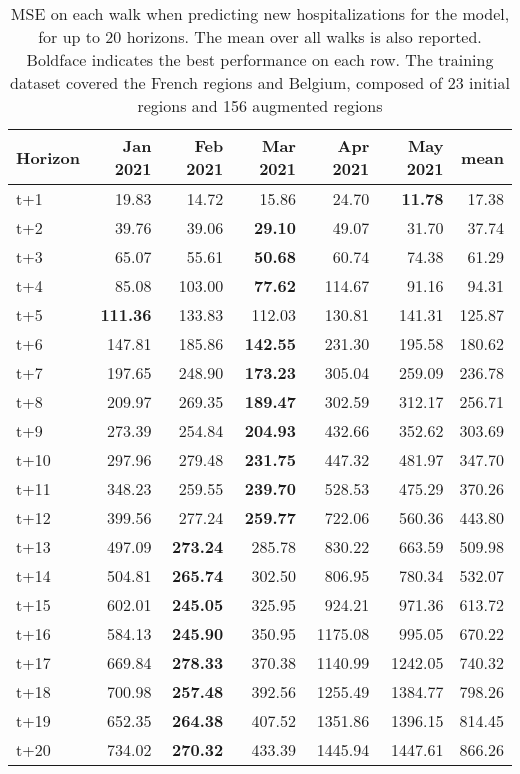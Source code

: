 \begin{table}[H]
\centering
\caption{MSE on each walk when predicting new hospitalizations for the model, for up to 20 horizons. The mean over all walks is also reported. Boldface indicates the best performance on each row. The training dataset covered the French regions and Belgium, composed of 23 initial regions and 156 augmented regions }
\label{tab:MSE_walk_dense_model}
\begin{tabular}{lrrrrrr}
\toprule
Horizon &  Jan 2021 &  Feb 2021 &  Mar 2021 &  Apr 2021 &  May 2021 &   mean \\
\midrule
t+1  & 19.83  & 14.72  & 15.86  & 24.70  & \textbf{11.78}  & 17.38  \\
t+2  & 39.76  & 39.06  & \textbf{29.10}  & 49.07  & 31.70  & 37.74  \\
t+3  & 65.07  & 55.61  & \textbf{50.68}  & 60.74  & 74.38  & 61.29  \\
t+4  & 85.08  & 103.00  & \textbf{77.62}  & 114.67  & 91.16  & 94.31  \\
t+5  & \textbf{111.36}  & 133.83  & 112.03  & 130.81  & 141.31  & 125.87  \\
t+6  & 147.81  & 185.86  & \textbf{142.55}  & 231.30  & 195.58  & 180.62  \\
t+7  & 197.65  & 248.90  & \textbf{173.23}  & 305.04  & 259.09  & 236.78  \\
t+8  & 209.97  & 269.35  & \textbf{189.47}  & 302.59  & 312.17  & 256.71  \\
t+9  & 273.39  & 254.84  & \textbf{204.93}  & 432.66  & 352.62  & 303.69  \\
t+10  & 297.96  & 279.48  & \textbf{231.75}  & 447.32  & 481.97  & 347.70  \\
t+11  & 348.23  & 259.55  & \textbf{239.70}  & 528.53  & 475.29  & 370.26  \\
t+12  & 399.56  & 277.24  & \textbf{259.77}  & 722.06  & 560.36  & 443.80  \\
t+13  & 497.09  & \textbf{273.24}  & 285.78  & 830.22  & 663.59  & 509.98  \\
t+14  & 504.81  & \textbf{265.74}  & 302.50  & 806.95  & 780.34  & 532.07  \\
t+15  & 602.01  & \textbf{245.05}  & 325.95  & 924.21  & 971.36  & 613.72  \\
t+16  & 584.13  & \textbf{245.90}  & 350.95  & 1175.08  & 995.05  & 670.22  \\
t+17  & 669.84  & \textbf{278.33}  & 370.38  & 1140.99  & 1242.05  & 740.32  \\
t+18  & 700.98  & \textbf{257.48}  & 392.56  & 1255.49  & 1384.77  & 798.26  \\
t+19  & 652.35  & \textbf{264.38}  & 407.52  & 1351.86  & 1396.15  & 814.45  \\
t+20  & 734.02  & \textbf{270.32}  & 433.39  & 1445.94  & 1447.61  & 866.26  \\

\bottomrule
\end{tabular}
\end{table}
